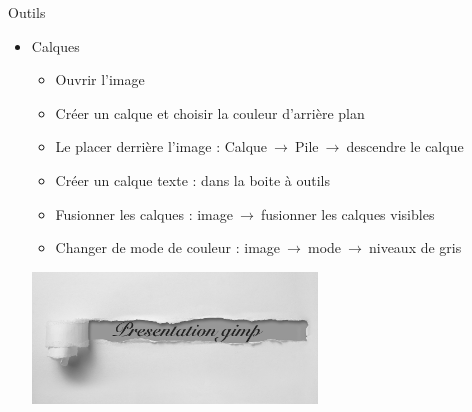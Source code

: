 \documentclass[xcolor=x11names,compress]{beamer}
\renewcommand{\(}{\begin{columns}}
\renewcommand{\)}{\end{columns}}
\newcommand{\<}[1]{\begin{column}{#1}}
\renewcommand{\>}{\end{column}}
\begin{document}
\begin{frame}{Outils}
\begin{itemize}
\item Calques \\
\begin{itemize}
\item Ouvrir l'image
\item Créer un calque et choisir la couleur d'arrière plan 
\item Le placer derrière l'image : Calque$\ \to\ $Pile$\ \to\ $descendre le calque
\item Créer un calque texte : dans la boite à outils
\item Fusionner les calques : image$\ \to\ $fusionner les calques visibles
\item Changer de mode de couleur : image$\ \to\ $mode$\ \to\ $niveaux de gris 
\end{itemize}
\begin{center}
\includegraphics[height=3.5cm]{ex1}
\end{center}
\end{itemize}
\end{frame}

\end{document}
